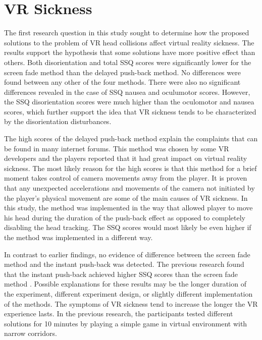\section{VR Sickness}

The first research question in this study sought to determine how the proposed solutions to the problem of VR head collisions affect virtual reality sickness. The results support the hypothesis that some solutions have more positive effect than others. Both disorientation and total SSQ scores were significantly lower for the screen fade method than the delayed push-back method. No differences were found between any other of the four methods. There were also no significant differences revealed in the case of SSQ nausea and oculumotor scores. However, the SSQ disorientation scores were much higher than the oculomotor and nausea scores, which further support the idea that VR sickness tends to be characterized by the disorientation disturbances. 

The high scores of the delayed push-back method explain the complaints that can be found in many internet forums. This method was chosen by some VR developers and the players reported that it had great impact on virtual reality sickness. The most likely reason for the high scores is that this method for a brief moment takes control of camera movements away from the player. It is proven that any unexpected accelerations and movements of the camera not initiated by the player's physical movement are some of the main causes of VR sickness. In this study, the method was implemented in the way that allowed player to move his head during the duration of the push-back effect as opposed to completely disabling the head tracking. The SSQ scores would most likely be even higher if the method was implemented in a different way.

In contrast to earlier findings, no evidence of difference between the screen fade method and the instant push-back was detected. The previous research found that the instant push-back achieved higher SSQ scores than the screen fade method \cite{COMPARISONCOLLISION}. Possible explanations for these results may be the longer duration of the experiment, different experiment design, or slightly different implementation of the methods. The symptoms of VR sickness tend to increase the longer the VR experience lasts. In the previous research, the participants tested different solutions for 10 minutes by playing a simple game in virtual environment with narrow corridors.

